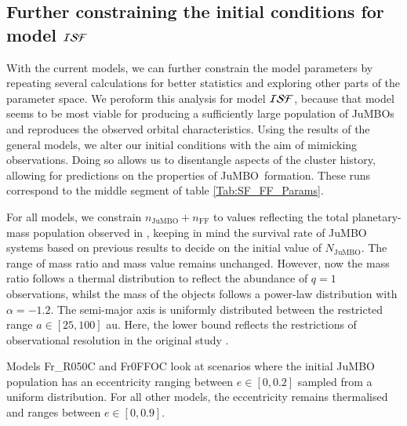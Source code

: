 \documentclass[submission,phys]{lib/SciPost}
\newcommand{\jumbo}{\mbox{JuMBO}}
\newcommand{\jumbos}{\mbox{JuMBOs}}
\begin{document}

\subsection{Further constraining the initial conditions for model ${\cal ISF}$}

With the current models, we can further constrain the model parameters
by repeating several calculations for better statistics and exploring
other parts of the parameter space.  We peroform this analysis for
model ${\cal ISF}$, because that model seems to be most viable for
producing a sufficiently large population of \jumbos\, and reproduces
the observed orbital characteristics.  Using the results of the
general models, we alter our initial conditions with the aim of
mimicking observations. Doing so allows us to disentangle aspects of
the cluster history, allowing for predictions on the properties of
\jumbo\, formation. These runs correspond to the middle segment of
table \ref{Tab:SF_FF_Params}.
    
For all models, we constrain $n_{\mathrm{\jumbo}} + n_{\mathrm{FF}}$ to
values reflecting the total planetary-mass population observed in
\cite{2023arXiv231001231P}, keeping in mind the survival rate of \jumbo
systems based on previous results to decide on the initial value of
$N_{\mathrm{\jumbo}}$. The range of mass ratio and mass value remains
unchanged. However, now the mass ratio follows a thermal distribution
to reflect the abundance of $q=1$ observations, whilst the mass of the
objects follows a power-law distribution with $\alpha = -1.2$. The
semi-major axis is uniformly distributed between the restricted range
$a\in[25,100]$ au. Here, the lower bound reflects the restrictions of
observational resolution in the original study
\cite{2023arXiv231001231P}.

Models Fr\_R050C and Fr0FFOC look at scenarios where the initial \jumbo\,
population has an eccentricity ranging between $e\in[0,0.2]$ sampled
from a uniform distribution. For all other models, the eccentricity
remains thermalised and ranges between $e\in[0,0.9]$.
 
\end{document}
